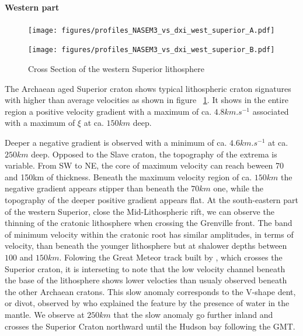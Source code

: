 \documentclass[12pt]{article}
\begin{document}
	\paragraph{Western part}
		\begin{figure}[h]
			\begin{minipage}{0.5\linewidth}
				\centerline{\texttt{[image: figures/profiles\_NASEM3\_vs\_dxi\_west\_superior\_A.pdf]}}
			\end{minipage}
			\hfill
			\begin{minipage}{0.5\linewidth}
				\centerline{\texttt{[image: figures/profiles\_NASEM3\_vs\_dxi\_west\_superior\_B.pdf]}}
			\end{minipage}

			\caption{Cross Section of the western Superior lithosphere}
			\label{westsupcross}

		\end{figure}

		The Archaean aged Superior craton shows typical lithospheric craton signatures with higher than average velocities as shown in figure ~\ref{westsupcross}. 
		It shows in the entire region a positive velocity gradient with a maximum of ca. $4.8km.s^{-1}$  associated with a maximum of $\xi$ at ca. $150km$ deep.

		Deeper a negative gradient is observed with a minimum of ca. $4.6km.s^{-1}$ at ca. $250km$ deep. 
		Opposed to the Slave craton, the topography of the extrema is variable. 
		From SW to NE, the core of maximum velocity can reach beween 70 and 150km of thickness. 
		Beneath the maximum velocity region of ca. $150km$ the negative gradient appears stipper than beneath the $70km$ one, while the topography of the deeper positive gradient appears flat. 
		At the south-eastern part of the western Superior, close the Mid-Lithospheric rift, we can observe the thinning of the cratonic lithosphere when crossing the Grenville front. 
		The band of minimum velocity within the cratonic root has similar amplitudes, in terms of velocity, than beneath the younger lithosphere but at shalower depths between $100$ and $150km$. 
		Folowing the Great Meteor track built by \cite{heaman2000timing}, which crosses the Superior craton, it is interseting to note that the low velocity channel beneath the base of the lithosphere shows lower velocties than usualy observed beneath the other Archaean cratons. 
		This slow anomaly corresponds to the V-shape dent, or divot, observed by \cite{lee1997upper} who explained the feature by the presence of water in the mantle. 
		We observe at $250km$ that the slow anomaly go further inland and crosses the Superior Craton northward until the Hudson bay following the GMT.
\end{document}
